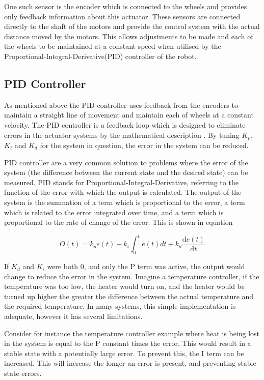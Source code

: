 One such sensor is the encoder which is connected to the wheels and provides 
only feedback information about this actuator. These sensors are connected 
directly to the shaft of the motors and provide the control system with the 
actual distance moved by the motors. This allows adjustments to be made and each 
of the wheels to be maintained at a constant speed when utilised by the 
Proportional-Integral-Derivative(PID) controller of the robot.  

\subsection{PID Controller}\label{litreview/robotics/pid}
As mentioned above the PID controller uses feedback from the encoders to maintain 
a straight line of movement and maintain each of wheels at a constant velocity. 
The PID controller is a feedback loop which is designed to eliminate errors in 
the actuator systems by the mathematical description . By tuning $ K_p $, $ K_i $ and $ K_d $ for the 
system in question, the error in the system can be reduced.   

PID controller are a very common solution to problems where the error of the 
system (the difference between the current state and the desired state) can be 
measured. PID stands for Proportional-Integral-Derivative, referring to the 
function of the error with which the output is calculated. The output of the 
system is the summation of a term which is proportional to the error, a term 
which is related to the error integrated over time, and a term which is 
proportional to the rate of change of the error. This is shown in equation 

$$ O(t) = k_{p}e(t) + k_i\int_{0}^{t}e(t)dt + k_d \frac{\mathrm{d} e(t) }{\mathrm{d} t}$$

If $K_d$ and $K_i$ were both 0, and only the P term was active, the output 
would change to reduce the error in the system. Imagine a temperature controller, 
if the temperature was too low, the heater would turn on, and the heater would 
be turned up higher the greater the difference between the actual temperature 
and the required temperature. In many systems, this simple implementation is 
adequate, however it has several limitations. 

Consider for instance the temperature controller example where heat is being lost 
in the system is equal to the P constant times the error. This would result in a 
stable state with a potentially large error. To prevent this, the I term can be 
increased. This will increase the longer an error is present, and preventing 
stable state errors. 

